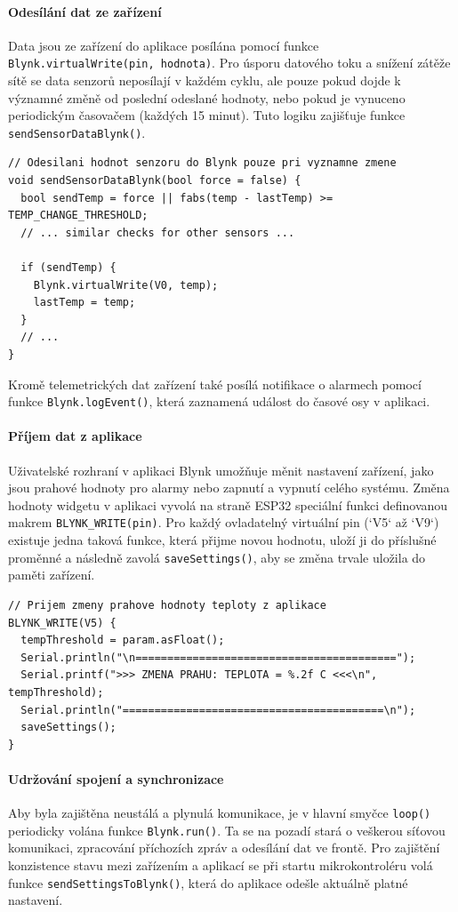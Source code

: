\documentclass[12pt, twoside]{article} %
\begin{document}
\paragraph{Odesílání dat ze zařízení}
Data jsou ze zařízení do aplikace posílána pomocí funkce \texttt{Blynk.virtualWrite(pin, hodnota)}. Pro úsporu datového toku a snížení zátěže sítě se data senzorů neposílají v každém cyklu, ale pouze pokud dojde k významné změně od poslední odeslané hodnoty, nebo pokud je vynuceno periodickým časovačem (každých 15 minut). Tuto logiku zajišťuje funkce \texttt{sendSensorDataBlynk()}.
\begin{lstlisting}
// Odesilani hodnot senzoru do Blynk pouze pri vyznamne zmene
void sendSensorDataBlynk(bool force = false) {
  bool sendTemp = force || fabs(temp - lastTemp) >= TEMP_CHANGE_THRESHOLD;
  // ... similar checks for other sensors ...

  if (sendTemp) {
    Blynk.virtualWrite(V0, temp);
    lastTemp = temp;
  }
  // ...
}
\end{lstlisting}
Kromě telemetrických dat zařízení také posílá notifikace o alarmech pomocí funkce \texttt{Blynk.logEvent()}, která zaznamená událost do časové osy v aplikaci.

\paragraph{Příjem dat z aplikace}
Uživatelské rozhraní v aplikaci Blynk umožňuje měnit nastavení zařízení, jako jsou prahové hodnoty pro alarmy nebo zapnutí a vypnutí celého systému. Změna hodnoty widgetu v aplikaci vyvolá na straně ESP32 speciální funkci definovanou makrem \texttt{BLYNK\_WRITE(pin)}. Pro každý ovladatelný virtuální pin (`V5` až `V9`) existuje jedna taková funkce, která přijme novou hodnotu, uloží ji do příslušné proměnné a následně zavolá \texttt{saveSettings()}, aby se změna trvale uložila do paměti zařízení.
\begin{lstlisting}
// Prijem zmeny prahove hodnoty teploty z aplikace
BLYNK_WRITE(V5) {
  tempThreshold = param.asFloat();
  Serial.println("\n=========================================");
  Serial.printf(">>> ZMENA PRAHU: TEPLOTA = %.2f C <<<\n", tempThreshold);
  Serial.println("=========================================\n");
  saveSettings();
}
\end{lstlisting}

\paragraph{Udržování spojení a synchronizace}
Aby byla zajištěna neustálá a plynulá komunikace, je v hlavní smyčce \texttt{loop()} periodicky volána funkce \texttt{Blynk.run()}. Ta se na pozadí stará o veškerou síťovou komunikaci, zpracování příchozích zpráv a odesílání dat ve frontě. Pro zajištění konzistence stavu mezi zařízením a aplikací se při startu mikrokontroléru volá funkce \texttt{sendSettingsToBlynk()}, která do aplikace odešle aktuálně platné nastavení.
\end{document}
